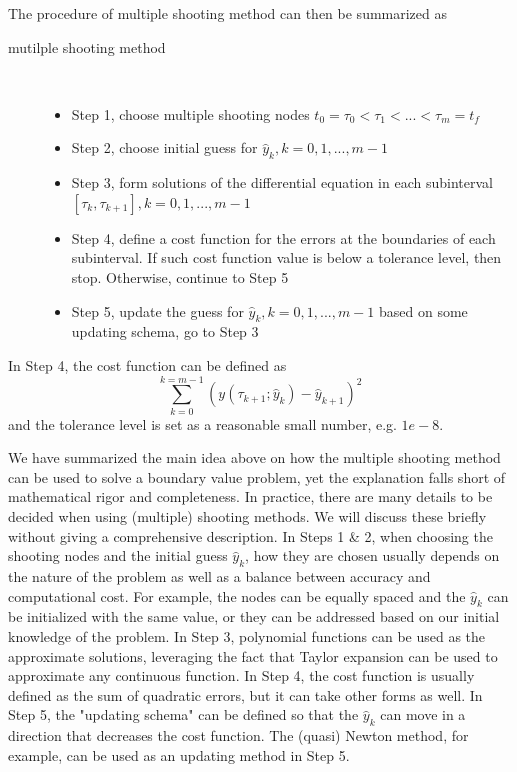 \documentclass  [
  paper    = a4,
  BCOR     = 10mm,
  twoside,
  fontsize = 12pt,
  fleqn,
  toc      = bibnumbered,
  toc      = listofnumbered,
  numbers  = noendperiod,
  headings = normal,
  listof   = leveldown,
  version  = 3.03
]                                       {scrreprt}
\newcommand{\<}{\langle}
\renewcommand{\>}{\rangle}
\begin{document}
The procedure of multiple shooting method can then be summarized as
\begin{description}
	\item[mutilple shooting method] \
	\begin{itemize}
		\item Step 1, choose multiple shooting nodes $t_0 = \tau_0 < \tau_1 < ... < \tau_m = t_f$ 
		\item Step 2, choose initial guess for $\hat{y}_k, k = 0, 1, ..., m-1$ 
		\item Step 3, form solutions of the differential equation in each subinterval $[\tau_k, \tau_{k+1}], k = 0, 1, ..., m-1$
		\item Step 4, define a cost function for the errors at the boundaries of each subinterval. If such cost function value is below a tolerance level, then stop. Otherwise, continue to Step 5
		\item Step 5, update the guess for $\hat{y}_k, k = 0, 1, ..., m-1$ based on some updating schema, go to Step 3
	\end{itemize}
\end{description}
In Step 4, the cost function can be defined as 
\begin{equation}
	\sum_{k=0}^{k=m-1}(y(\tau_{k+1}; \hat{y}_k) - \hat{y}_{k+1})^2
\end{equation}
and the tolerance level is set as a reasonable small number, e.g. $1e-8$.

We have summarized the main idea above on how the multiple shooting method can be used to solve a boundary value problem, yet the explanation falls short of mathematical rigor and completeness. In practice, there are many details to be decided when using (multiple) shooting methods. We will discuss these briefly without giving a comprehensive description. In Steps 1 \& 2, when choosing the shooting nodes and the initial guess $\hat{y}_k$, how they are chosen usually depends on the nature of the problem as well as a balance between accuracy and computational cost. For example, the nodes can be equally spaced and the $\hat{y}_k$ can be initialized with the same value, or they can be addressed based on our initial knowledge of the problem. In Step 3, polynomial functions can be used as the approximate solutions, leveraging the fact that Taylor expansion can be used to approximate any continuous function. In Step 4, the cost function is usually defined as the sum of quadratic errors, but it can take other forms as well. In Step 5, the "updating schema" can be defined so that the $\hat{y}_k$ can move in a direction that decreases the cost function. The (quasi) Newton method, for example, can be used as an updating method in Step 5.
\end{document}
